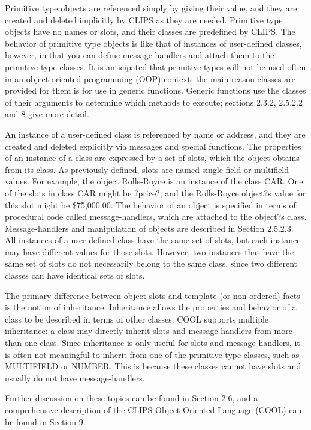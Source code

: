 \documentclass[letterpaper,10pt,english]{sphinxmanual}
\begin{document}
Primitive type objects are referenced simply by giving their value, and
they are created and deleted implicitly by CLIPS as they are needed.
Primitive type objects have no names or slots, and their classes are
predefined by CLIPS. The behavior of primitive type objects is like that
of instances of user-defined classes, however, in that you can define
message-handlers and attach them to the primitive type classes. It is
anticipated that primitive types will not be used often in an
object-oriented programming (OOP) context; the main reason classes are
provided for them is for use in generic functions. Generic functions use
the classes of their arguments to determine which methods to execute;
sections 2.3.2, 2.5.2.2 and 8 give more detail.

An instance of a user-defined class is referenced by name or address,
and they are created and deleted explicitly via messages and special
functions. The properties of an instance of a  class are
expressed by a set of slots, which the object obtains from its class. As
previously defined, slots are named single field or multifield values.
For example, the object Rolls-Royce is an instance of the class CAR. One
of the slots in class CAR might be ?price?, and the Rolls-Royce object?s
value for this slot might be \$75,000.00. The behavior of an object is
specified in terms of procedural code called message-handlers, which are
attached to the object?s class. Message-handlers and manipulation of
objects are described in Section 2.5.2.3. All instances of a
user-defined class have the same set of slots, but each instance may
have different values for those slots. However, two instances that have
the same set of slots do not necessarily belong to the same class, since
two different classes can have identical sets of slots.

The primary difference between object slots and template (or
non-ordered) facts is the notion of inheritance. Inheritance allows the
properties and behavior of a class to be described in terms of other
classes. COOL supports multiple inheritance: a class may directly
inherit slots and message-handlers from more than one class. Since
inheritance is only useful for slots and message-handlers, it is often
not meaningful to inherit from one of the primitive type classes, such
as MULTIFIELD or NUMBER. This is because these classes cannot have slots
and usually do not have message-handlers.

Further discussion on these topics can be found in Section 2.6, and a
comprehensive description of the CLIPS Object-Oriented Language (COOL)
can be found in Section 9.
\end{document}
